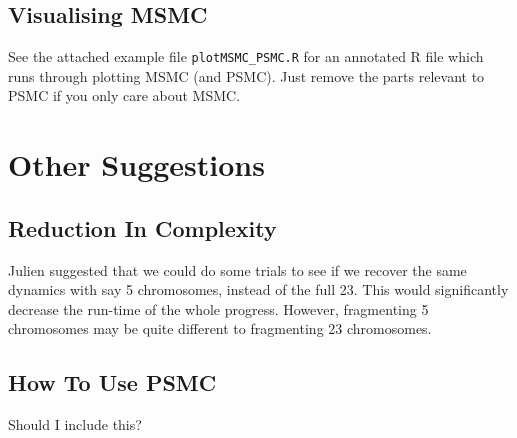 \documentclass[11pt,a4paper]{article}
\begin{document}
\subsection{Visualising MSMC}
See the attached example file \texttt{plotMSMC\_PSMC.R} for an annotated R file which runs through plotting MSMC (and PSMC). Just remove the parts relevant to PSMC if you only care about MSMC.


\section{Other Suggestions}
\subsection{Reduction In Complexity}
Julien suggested that we could do some trials to see if we recover the same dynamics with say 5 chromosomes, instead of the full 23. This would significantly decrease the run-time of the whole progress. However, fragmenting 5 chromosomes may be quite different to fragmenting 23 chromosomes.

\subsection{How To Use PSMC}
Should I include this?


{}
\end{document}
